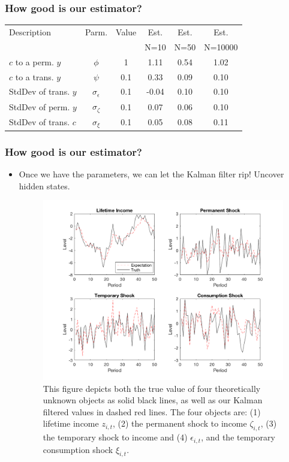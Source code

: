 \documentclass{beamer}
\begin{document}
\begin{frame}
\frametitle[alignment=center]{How good is our estimator?}
\begin{table}[ht!]
\centering
\begin{tabular}{lccccc}
\hline\hline
Description & Parm. & Value & Est.  & Est.  & Est. \\
 &  &  & N=10 & N=50 & N=10000\\
\hline
$c$ to a perm. $y$  & $\phi$ & 1 & 1.11 & 0.54 & 1.02\\
$c$ to a trans. $y$  & $\psi$ & 0.1 & 0.33 & 0.09 & 0.10\\
StdDev of trans. $y$  & $\sigma_\epsilon$ & 0.1 & -0.04 & 0.10 & 0.10\\
StdDev of perm. $y$  & $\sigma_\zeta$ & 0.1 & 0.07 & 0.06 & 0.10\\
StdDev of trans. $c$  & $\sigma_\xi$ & 0.1 & 0.05 & 0.08 & 0.11\\
\hline\hline
\end{tabular}
\end{table}
\end{frame}

\begin{frame}
\frametitle[alignment=center]{How good is our estimator?}
\begin{itemize}
\item Once we have the parameters, we can let the Kalman filter rip!  Uncover hidden states.
\begin{figure}[ht!]
\centering
\includegraphics[scale=0.5]{KalmanFilter.png}
\caption{This figure depicts both the true value of four theoretically unknown objects as solid black lines, as well as our Kalman filtered values in dashed red lines.  The four objects are: (1) lifetime income $z_{i,t}$, (2) the permanent shock to income $\zeta_{i,t}$, (3) the temporary shock to income and (4) $\epsilon_{i,t}$, and the temporary consumption shock $\xi_{i,t}$.}
\label{fig:kalfilter}
\end{figure}
\end{itemize}
\end{frame}
\end{document}
